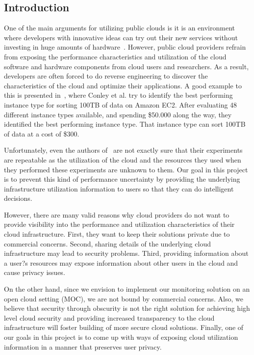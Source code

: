 \subsection{Introduction}

One of the main arguments for utilizing public clouds is it is an environment where developers with innovative ideas can try out their new services without investing in huge amounts of hardware~\cite{Armbrust2009}. However, public cloud providers refrain from exposing the performance characteristics and utilization of the cloud software and hardware components from cloud users and researchers. As a result, developers are often forced to do reverse engineering to discover the characteristics of the cloud and optimize their applications. A good example to this is presented in~\cite{conley2015achieving}, where Conley et al. try to identify the best performing instance type for sorting 100TB of data on Amazon EC2. After evaluating 48 different instance types available, and spending \$50.000 along the way, they identified the best performing instance type. That instance type can sort 100TB of data at a cost of \$300. 

Unfortunately, even the authors of~\cite{conley2015achieving} are not exactly sure that their experiments are repeatable as the utilization of the cloud and the resources they used when they performed these experiments are unknown to them. Our goal in this project is to prevent this kind of performance uncertainty by providing the underlying infrastructure utilization information to users so that they can do intelligent decisions.          

However, there are many valid reasons why cloud providers do not want to provide visibility into the performance and utilization characteristics of their cloud infrastructure. First, they want to keep their solutions private due to commercial concerns. Second, sharing details of the underlying cloud infrastructure may lead to security problems. Third, providing information about a user?s resources may expose information about other users in the cloud and cause privacy issues. 

On the other hand, since we envision to implement our monitoring solution on an open cloud setting (MOC), we are not bound by commercial concerns. Also, we believe that security through obscurity is not the right solution for achieving high level cloud security and providing increased transparency to the cloud infrastructure will foster building of more secure cloud solutions. Finally, one of our goals in this project is to come up with ways of exposing cloud utilization information in a manner that preserves user privacy.